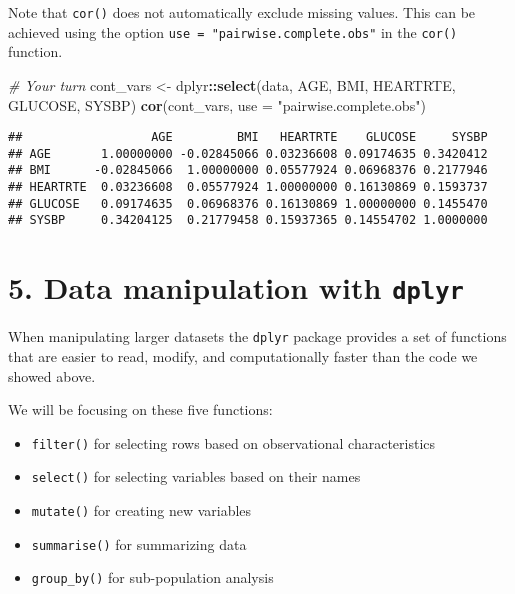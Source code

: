 \documentclass[
]{article}
\newenvironment{Shaded}{\begin{snugshade}}{\end{snugshade}}
\newcommand{\CommentTok}[1]{\textcolor[rgb]{0.56,0.35,0.01}{\textit{#1}}}
\newcommand{\DataTypeTok}[1]{\textcolor[rgb]{0.13,0.29,0.53}{#1}}
\newcommand{\KeywordTok}[1]{\textcolor[rgb]{0.13,0.29,0.53}{\textbf{#1}}}
\newcommand{\NormalTok}[1]{#1}
\newcommand{\OperatorTok}[1]{\textcolor[rgb]{0.81,0.36,0.00}{\textbf{#1}}}
\newcommand{\StringTok}[1]{\textcolor[rgb]{0.31,0.60,0.02}{#1}}
\providecommand{\tightlist}{%
  \setlength{\itemsep}{0pt}\setlength{\parskip}{0pt}}
\begin{document}
Note that \texttt{cor()} does not automatically exclude missing values.
This can be achieved using the option
\texttt{use\ =\ "pairwise.complete.obs"} in the \texttt{cor()} function.

\begin{Shaded}
\begin{Highlighting}[]
\CommentTok{# Your turn}
\NormalTok{cont_vars <-}\StringTok{ }\NormalTok{dplyr}\OperatorTok{::}\KeywordTok{select}\NormalTok{(data, AGE, BMI, HEARTRTE, GLUCOSE, SYSBP)}
\KeywordTok{cor}\NormalTok{(cont_vars, }\DataTypeTok{use =} \StringTok{"pairwise.complete.obs"}\NormalTok{)}
\end{Highlighting}
\end{Shaded}

\begin{verbatim}
##                  AGE         BMI   HEARTRTE    GLUCOSE     SYSBP
## AGE       1.00000000 -0.02845066 0.03236608 0.09174635 0.3420412
## BMI      -0.02845066  1.00000000 0.05577924 0.06968376 0.2177946
## HEARTRTE  0.03236608  0.05577924 1.00000000 0.16130869 0.1593737
## GLUCOSE   0.09174635  0.06968376 0.16130869 1.00000000 0.1455470
## SYSBP     0.34204125  0.21779458 0.15937365 0.14554702 1.0000000
\end{verbatim}

\hypertarget{data-manipulation-with-dplyr}{%
\section{\texorpdfstring{5. Data manipulation with
\texttt{dplyr}}{5. Data manipulation with dplyr}}\label{data-manipulation-with-dplyr}}

When manipulating larger datasets the \texttt{dplyr} package provides a
set of functions that are easier to read, modify, and computationally
faster than the code we showed above.

We will be focusing on these five functions:

\begin{itemize}
\tightlist
\item
  \texttt{filter()} for selecting rows based on observational
  characteristics
\item
  \texttt{select()} for selecting variables based on their names
\item
  \texttt{mutate()} for creating new variables
\item
  \texttt{summarise()} for summarizing data
\item
  \texttt{group\_by()} for sub-population analysis
\end{itemize}
\end{document}
